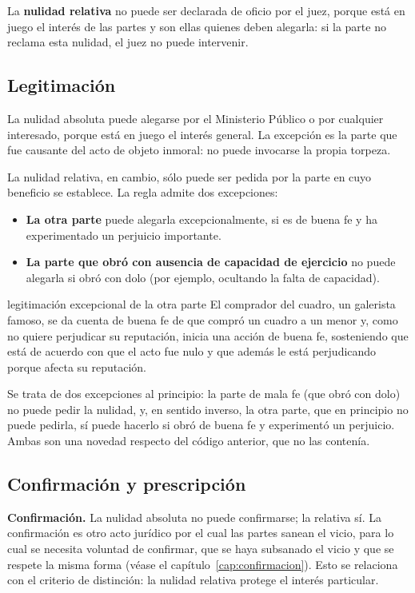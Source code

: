 \documentclass[12pt,oneside]{book}
\begin{document}
La \textbf{nulidad relativa} no puede ser declarada de oficio por el juez, porque está en juego el interés de las partes y son ellas quienes deben alegarla: si la parte no reclama esta nulidad, el juez no puede intervenir.

\subsection{Legitimación}

La nulidad absoluta puede alegarse por el Ministerio Público o por cualquier interesado, porque está en juego el interés general. La excepción es la parte que fue causante del acto de objeto inmoral: no puede invocarse la propia torpeza.

La nulidad relativa, en cambio, sólo puede ser pedida por la parte en cuyo beneficio se establece. La regla admite dos excepciones:

\begin{itemize}
    \item \textbf{La otra parte} puede alegarla excepcionalmente, si es de buena fe y ha experimentado un perjuicio importante.
    \item \textbf{La parte que obró con ausencia de capacidad de ejercicio} no puede alegarla si obró con dolo (por ejemplo, ocultando la falta de capacidad).
\end{itemize}

\begin{example}{legitimación excepcional de la otra parte}
El comprador del cuadro, un galerista famoso, se da cuenta de buena fe de que compró un cuadro a un menor y, como no quiere perjudicar su reputación, inicia una acción de buena fe, sosteniendo que está de acuerdo con que el acto fue nulo y que además le está perjudicando porque afecta su reputación.
\end{example}

Se trata de dos excepciones al principio: la parte de mala fe (que obró con dolo) no puede pedir la nulidad, y, en sentido inverso, la otra parte, que en principio no puede pedirla, sí puede hacerlo si obró de buena fe y experimentó un perjuicio. Ambas son una novedad respecto del código anterior, que no las contenía.

\subsection{Confirmación y prescripción}

\textbf{Confirmación.} La nulidad absoluta no puede confirmarse; la relativa sí. La confirmación es otro acto jurídico por el cual las partes sanean el vicio, para lo cual se necesita voluntad de confirmar, que se haya subsanado el vicio y que se respete la misma forma (véase el capítulo~\ref{cap:confirmacion}). Esto se relaciona con el criterio de distinción: la nulidad relativa protege el interés particular.
\end{document}

